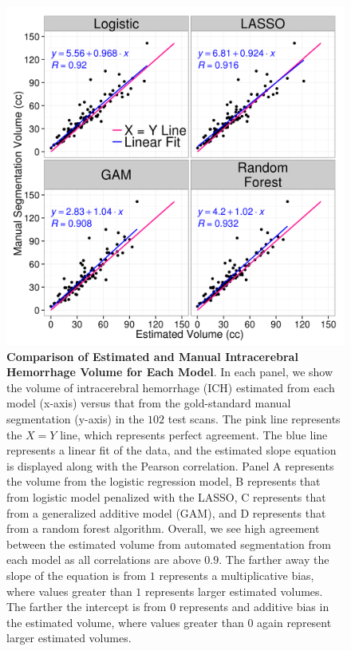 \documentclass{elsarticle_nonatbib}\usepackage[]{graphicx}\usepackage[]{color}
\begin{document}
\begin{figure}
\centering

\includegraphics[width=\linewidth,keepaspectratio]{Reseg_Volume_Comparison.png}
\caption{{\bf Comparison of Estimated and Manual Intracerebral Hemorrhage Volume for Each Model}.  In each panel, we show the volume of intracerebral hemorrhage (ICH) estimated from each model (x-axis) versus that from the gold-standard manual segmentation (y-axis) in the $102$ test scans.  The pink line represents the $X=Y$ line, which represents perfect agreement.  The blue line represents a linear fit of the data, and the estimated slope equation is displayed along with the Pearson correlation.  Panel A represents the volume from the logistic regression model, B represents that from logistic model penalized with the LASSO, C represents that from a generalized additive model (GAM), and D represents that from a random forest algorithm.  Overall, we see high agreement between the estimated volume from automated segmentation from each model as all correlations are above $0.9$.  The farther away the slope of the equation is from $1$ represents a multiplicative bias, where values greater than $1$ represents larger estimated volumes.  The farther the intercept is from $0$ represents and additive bias in the estimated volume, where values greater than $0$ again represent larger estimated volumes.  }
\label{fig:vol}
\end{figure}
\end{document}
